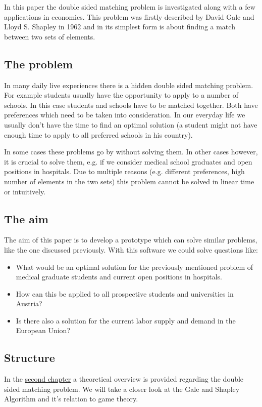 \label{introduction}
In this paper the double sided matching problem is investigated along with a few applications in economics.
This problem was firstly described by David Gale and Lloyd S. Shapley in 1962 \cite{gale62a} and in its simplest form is about finding a match between two sets of elements.

\subsection{The problem}
In many daily live experiences there is a hidden double sided matching problem. 
For example students usually have the opportunity to apply to a number of schools. 
In this case students and schools have to be matched together. 
Both have preferences which need to be taken into consideration. 
In our everyday life we usually don't have the time to find an optimal solution (a student might not have enough time to apply to all preferred schools in his country). 

In some cases these problems go by without solving them. 
In other cases however, it is crucial to solve them, e.g. if we consider medical school graduates and open positions in hospitals. 
Due to multiple reasons (e.g. different preferences, high number of elements in the two sets) this problem cannot be solved in linear time or intuitively.

\subsection{The aim}
The aim of this paper is to develop a prototype which can solve similar problems, like the one discussed previously.
With this software we could solve questions like:
\begin{itemize}
			\item What would be an optimal solution for the previously mentioned problem of medical graduate students and current open positions in hospitals.
			\item How can this be applied to all prospective students and universities in Austria?
			\item Is there also a solution for the current labor supply and demand in the European Union?
			\end{itemize}

\subsection{Structure}
In the \hyperref[theory]{second chapter} a theoretical overview is provided regarding the double sided matching problem.
We will take a closer look at the Gale and Shapley Algorithm and it's relation to game theory.

